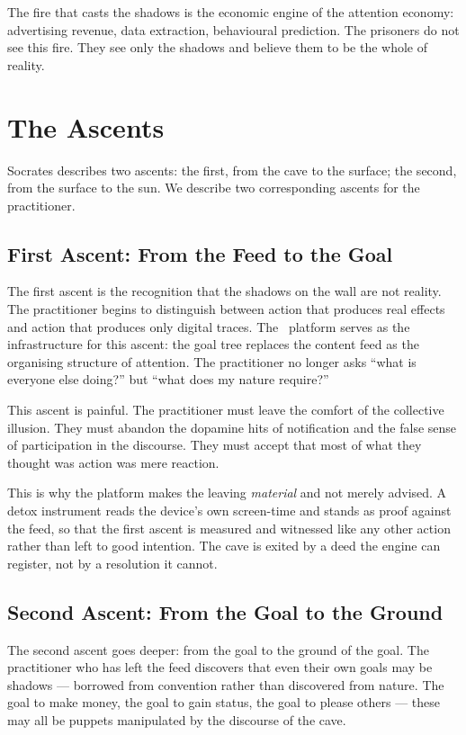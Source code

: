The fire that casts the shadows is the economic engine of the attention economy:
advertising revenue, data extraction, behavioural prediction. The prisoners do
not see this fire. They see only the shadows and believe them to be the whole
of reality.

\section{The Ascents}

Socrates describes two ascents: the first, from the cave to the surface; the
second, from the surface to the sun. We describe two corresponding ascents for
the practitioner.

\subsection{First Ascent: From the Feed to the Goal}

The first ascent is the recognition that the shadows on the wall are not reality.
The practitioner begins to distinguish between action that produces real effects
and action that produces only digital traces. The \praxis\ platform serves as
the infrastructure for this ascent: the goal tree replaces the content feed as
the organising structure of attention. The practitioner no longer asks ``what
is everyone else doing?'' but ``what does my nature require?''

This ascent is painful. The practitioner must leave the comfort of the collective
illusion. They must abandon the dopamine hits of notification and the false
sense of participation in the discourse. They must accept that most of what
they thought was action was mere reaction.

This is why the platform makes the leaving \emph{material} and not merely advised.
A detox instrument reads the device's own screen-time and stands as proof against
the feed, so that the first ascent is measured and witnessed like any other action
rather than left to good intention. The cave is exited by a deed the engine can
register, not by a resolution it cannot.

\subsection{Second Ascent: From the Goal to the Ground}

The second ascent goes deeper: from the goal to the ground of the goal. The
practitioner who has left the feed discovers that even their own goals may be
shadows --- borrowed from convention rather than discovered from nature. The
goal to make money, the goal to gain status, the goal to please others --- these
may all be puppets manipulated by the discourse of the cave.

